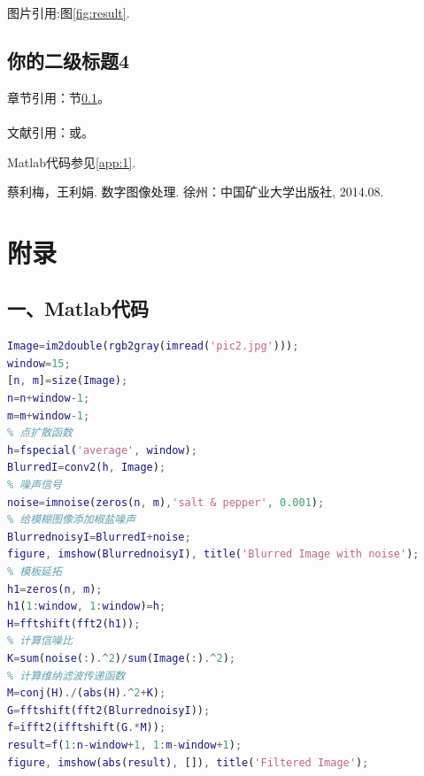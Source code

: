 \documentclass{zjgsureport}
\newcommand{\upcite}[1]{\textsuperscript{\textsuperscript{\cite{#1}}}}
\begin{document}
图片引用:图\ref{fig:result}.


\subsection{你的二级标题4} \label{else}

章节引用：节\ref{else}。

文献引用：\cite{cai}或\upcite{cai}。

Matlab代码参见\ref{app:1}.
\clearpage

\begin{thebibliography}{99}
    蔡利梅，王利娟. 数字图像处理. 徐州：中国矿业大学出版社, 2014.08.
\end{thebibliography}
\clearpage

\section*{附录}
\small
\subsection*{一、Matlab代码} \label{app:1}
\begin{lstlisting}[language=matlab]
Image=im2double(rgb2gray(imread('pic2.jpg')));
window=15;
[n, m]=size(Image);
n=n+window-1;
m=m+window-1;
% 点扩散函数
h=fspecial('average', window);
BlurredI=conv2(h, Image);
% 噪声信号
noise=imnoise(zeros(n, m),'salt & pepper', 0.001);
% 给模糊图像添加椒盐噪声
BlurrednoisyI=BlurredI+noise;
figure, imshow(BlurrednoisyI), title('Blurred Image with noise');
% 模板延拓
h1=zeros(n, m);
h1(1:window, 1:window)=h;
H=fftshift(fft2(h1));
% 计算信噪比
K=sum(noise(:).^2)/sum(Image(:).^2);
% 计算维纳滤波传递函数
M=conj(H)./(abs(H).^2+K);
G=fftshift(fft2(BlurrednoisyI));
f=ifft2(ifftshift(G.*M));
result=f(1:n-window+1, 1:m-window+1);
figure, imshow(abs(result), []), title('Filtered Image');
\end{lstlisting}
\end{document}
